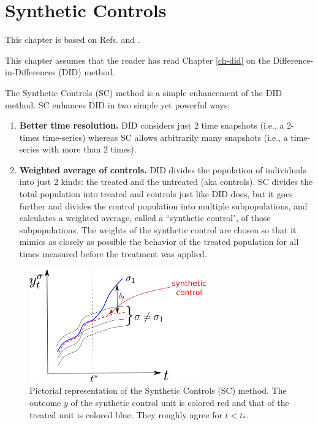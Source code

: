 \chapter{Synthetic Controls}
\label{ch-syn-con}

This chapter is based on Refs.\cite{alves-book}
and \cite{book-mixtape}.

This chapter assumes that
the reader has read Chapter \ref{ch-did}
on the Difference-in-Differences (DID) method.

The Synthetic Controls (SC) method
is a simple enhancement of the DID method.
SC enhances DID in two simple
yet powerful ways:
\begin{enumerate}
\item{\bf Better time resolution.}
DID considers just 2 time snapshots (i.e., a 2-times
time-series)
whereas SC allows
arbitrarily many snapshots (i.e., a time-series with
more than 2 times).
\item{\bf Weighted average of controls.}
DID divides the population
of individuals into just 2 kinds:
the treated and the untreated (aka controls).
SC
divides the 
total population 
into treated and controls
just like DID does, but
it goes further and divides the control population into
multiple subpopulations,
and calculates a weighted average,
called a
``synthetic control",
of those subpopulations.
The weights of the synthetic
control are chosen so that
it mimics as closely as possible
the behavior
of  the treated population for all times
measured before the treatment
was applied.
\end{enumerate}


\begin{figure}[h!]
\centering
\includegraphics[width=3in]
{syn-con/syn-con-p-lines.png}
\caption{Pictorial
representation of the Synthetic Controls (SC) method.
The outcome $y$ of the synthetic control unit
is colored red and that of the treated unit
is colored blue.
They 
roughly agree for $t<t_*$.
} 
\label{fig-syn-con-p-lines}
\end{figure}


